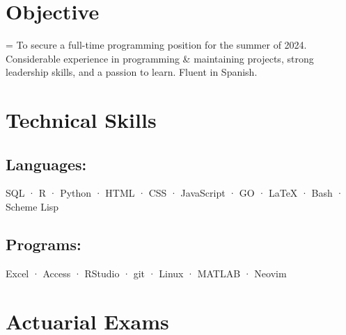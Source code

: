 \documentclass[12pt]{article}
\newcommand{\itemspace}{\vspace{0.1870em}}
\renewcommand{\textsc}[1]{\uppercase{\footnotesize#1}\normalsize}
\begin{document}
\maketitle

\vspace{-2.8mm}
\noindent\hrulefill

\vspace{-4.5mm}
\noindent\hrulefill

\itemspace
\section{Objective}

\hangindent=\parindent %
To secure a full-time programming position for the summer of 2024.
Considerable experience in programming \& maintaining projects,
strong leadership skills, and a passion to learn. Fluent in Spanish.

\itemspace

\section{Technical Skills}

\subsection{Languages:} \:
\textsc{sql} · \textsc{r} · Python · \textsc{html} · \textsc{css} ·
JavaScript · \textsc{go} · \LaTeX{} · Bash · Scheme Lisp

\subsection{Programs:} \:
Excel · Access · RStudio · git ·  Linux · \textsc{MATLAB} · Neovim

\itemspace

\section{Actuarial Exams}
\end{document}
